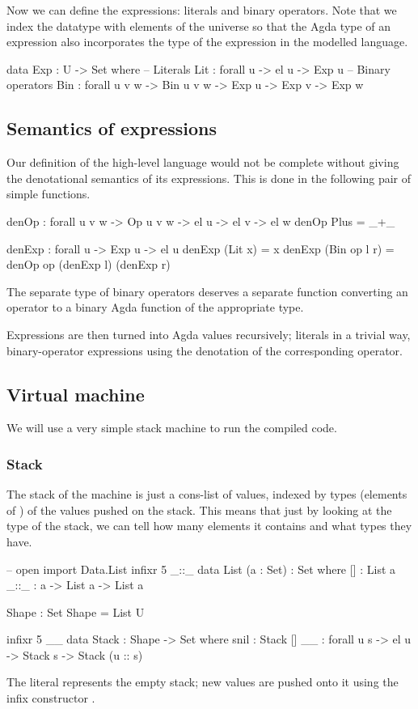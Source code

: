\noindent Now we can define the expressions: literals and binary operators.
Note that we index the datatype with elements of the universe  so that
the Agda type of an expression also incorporates the type of the expression in
the modelled language.

\begin{code}
  data Exp : U -> Set where
    -- Literals
    Lit : forall {u} -> el u -> Exp u
    -- Binary operators
    Bin : forall {u v w} -> Bin u v w -> Exp u -> Exp v -> Exp w
\end{code}

\subsection{Semantics of expressions}

Our definition of the high-level language would not be complete without giving
the denotational semantics of its expressions. This is done in the following
pair of simple functions.

\begin{code}
  denOp : forall {u v w} -> Op u v w -> el u -> el v -> el w
  denOp Plus = _+\_

  denExp : forall {u} -> Exp u -> el u
  denExp (Lit x) = x
  denExp (Bin op l r) = denOp op (denExp l) (denExp r)
\end{code}

\noindent The separate type of binary operators deserves a separate function
converting an operator to a binary Agda function of the appropriate type.

Expressions are then turned into Agda values recursively; literals in a trivial
way, binary-operator expressions using the denotation of the corresponding
operator.

\subsection{Virtual machine}

We will use a very simple stack machine to run the compiled code.

\subsubsection{Stack}

The stack of
the machine is just a cons-list of values, indexed by types (elements of
) of the values pushed on the stack.  This means that just by looking
at the type of the stack, we can tell how many elements it contains and what
types they have.
\begin{code}
  -- open import Data.List
  infixr 5 _::_
  data List (a : Set) : Set where
    [] : List a
    _::_ : a -> List a -> List a

  Shape : Set
  Shape = List U

  infixr 5 _\scons\_
  data Stack : Shape -> Set where
    snil : Stack []
    _\scons\_ : forall {u s} -> el u -> Stack s -> Stack (u :: s)
\end{code}
\noindent The literal  represents the empty stack; new values are
pushed onto it using the infix constructor \ident{\bin{\scons}}.

